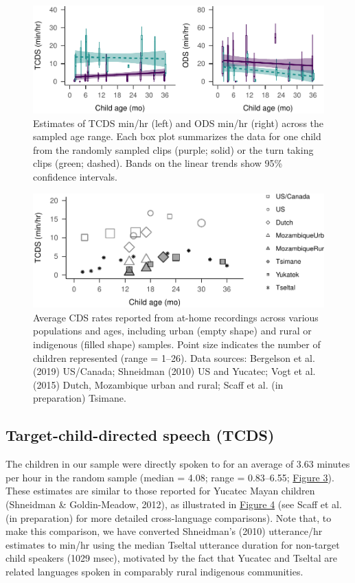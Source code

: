 \documentclass[floatsintext,man]{apa6}
\theoremstyle{definition}
\theoremstyle{definition}
\theoremstyle{definition}
\theoremstyle{remark}
\begin{document}
\begin{figure}
\centering
\includegraphics{Tseltal-CLE_files/figure-latex/fig3-1.pdf}
\caption{\label{fig:fig3}Estimates of TCDS min/hr (left) and ODS min/hr
(right) across the sampled age range. Each box plot summarizes the data
for one child from the randomly sampled clips (purple; solid) or the
turn taking clips (green; dashed). Bands on the linear trends show 95\%
confidence intervals.}
\end{figure}

\begin{figure}
\centering
\includegraphics{Tseltal-CLE_files/figure-latex/fig4-1.pdf}
\caption{\label{fig:fig4}Average CDS rates reported from at-home recordings
across various populations and ages, including urban (empty shape) and
rural or indigenous (filled shape) samples. Point size indicates the
number of children represented (range = 1--26). Data sources: Bergelson
et al. (2019) US/Canada; Shneidman (2010) US and Yucatec; Vogt et al.
(2015) Dutch, Mozambique urban and rural; Scaff et al. (in preparation)
Tsimane.}
\end{figure}

\subsection{Target-child-directed speech
(TCDS)}\label{target-child-directed-speech-tcds}

The children in our sample were directly spoken to for an average of
3.63 minutes per hour in the random sample (median = 4.08; range =
0.83--6.55; \protect\hyperlink{fig3}{Figure 3}). These estimates are
similar to those reported for Yucatec Mayan children (Shneidman \&
Goldin-Meadow, 2012), as illustrated in \protect\hyperlink{fig4}{Figure
4} (see Scaff et al. (in preparation) for more detailed cross-language
comparisons). Note that, to make this comparison, we have converted
Shneidman's (2010) utterance/hr estimates to min/hr using the median
Tseltal utterance duration for non-target child speakers (1029 msec),
motivated by the fact that Yucatec and Tseltal are related languages
spoken in comparably rural indigenous communities.
\end{document}
